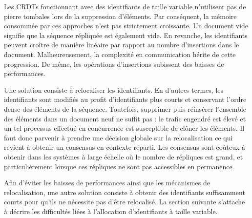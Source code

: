 Les CRDTs fonctionnant avec des identifiants de taille variable n'utilisent pas
de pierre tombales lors de la suppression d'éléments. Par conséquent, la mémoire
consommée par ces approches n'est pas strictement croissante. Un document vide
signifie que la séquence répliquée est également vide. En revanche, les
identifiants peuvent croître de manière linéaire par rapport au nombre
d'insertions dans le document. Malheureusement, la complexité en communication
hérite de cette progression. De même, les opérations d'insertions subissent des
baisses de performances. 

Une solution consiste à relocaliser les identifiants. En d'autres termes, les
identifiants sont modifiés au profit d'identifiants plus courts et conservant
l'ordre dense des éléments de la séquence. Toutefois, supprimer puis réinsérer
l'ensemble des éléments dans un document neuf ne suffit pas : le trafic engendré
est élevé et un tel processus effectué en concurrence est susceptible de clôner
les éléments. Il faut donc parvenir à prendre une décision globale sur la
relocalisation ce qui revient à obtenir un consensus en contexte réparti. Les
consensus sont coûteux à obtenir dans les systèmes à large échelle où le nombre
de répliques est grand, et particulièrement lorsque ces répliques ne sont pas
accessibles en permanence.

Afin d'éviter les baisses de performances ainsi que les mécanismes de
relocalisation, une autre solution consiste à obtenir des identifiants
suffisamment courts pour qu'ils ne nécessite pas d'être relocalisé. La section
suivante s'attache à décrire les difficultés liées à l'allocation d'identifiants
à taille variable.

